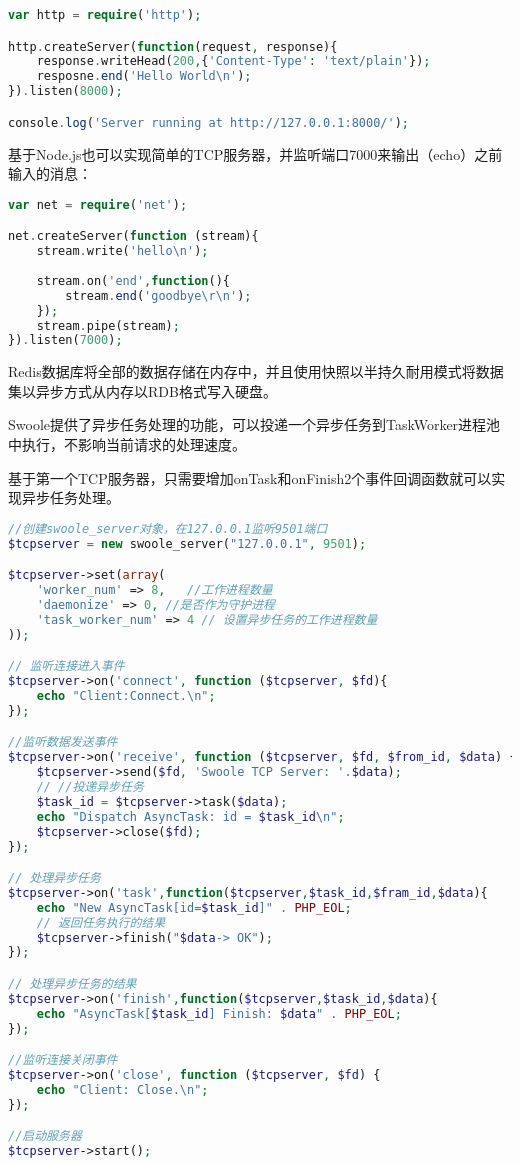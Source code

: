 \begin{lstlisting}[language=PHP]
var http = require('http');

http.createServer(function(request, response){
	response.writeHead(200,{'Content-Type': 'text/plain'});
	resposne.end('Hello World\n');
}).listen(8000);

console.log('Server running at http://127.0.0.1:8000/');
\end{lstlisting}

基于Node.js也可以实现简单的TCP服务器，并监听端口7000来输出（echo）之前输入的消息：

\begin{lstlisting}[language=PHP]
var net = require('net');

net.createServer(function (stream){
	stream.write('hello\n');
	
	stream.on('end',function(){
		stream.end('goodbye\r\n');
	});
	stream.pipe(stream);
}).listen(7000);
\end{lstlisting}

Redis数据库将全部的数据存储在内存中，并且使用快照以半持久耐用模式将数据集以异步方式从内存以RDB格式写入硬盘。

Swoole提供了异步任务处理的功能，可以投递一个异步任务到TaskWorker进程池中执行，不影响当前请求的处理速度。

基于第一个TCP服务器，只需要增加onTask和onFinish2个事件回调函数就可以实现异步任务处理。



\begin{lstlisting}[language=PHP]
//创建swoole_server对象，在127.0.0.1监听9501端口
$tcpserver = new swoole_server("127.0.0.1", 9501);

$tcpserver->set(array(
    'worker_num' => 8,   //工作进程数量
    'daemonize' => 0, //是否作为守护进程
    'task_worker_num' => 4 // 设置异步任务的工作进程数量
));

// 监听连接进入事件
$tcpserver->on('connect', function ($tcpserver, $fd){
    echo "Client:Connect.\n";
});

//监听数据发送事件
$tcpserver->on('receive', function ($tcpserver, $fd, $from_id, $data) {
    $tcpserver->send($fd, 'Swoole TCP Server: '.$data);
    // //投递异步任务
    $task_id = $tcpserver->task($data);
    echo "Dispatch AsyncTask: id = $task_id\n";
    $tcpserver->close($fd);
});

// 处理异步任务
$tcpserver->on('task',function($tcpserver,$task_id,$fram_id,$data){
	echo "New AsyncTask[id=$task_id]" . PHP_EOL;
	// 返回任务执行的结果
	$tcpserver->finish("$data-> OK");
});

// 处理异步任务的结果
$tcpserver->on('finish',function($tcpserver,$task_id,$data){
	echo "AsyncTask[$task_id] Finish: $data" . PHP_EOL;
});

//监听连接关闭事件
$tcpserver->on('close', function ($tcpserver, $fd) {
    echo "Client: Close.\n";
});

//启动服务器
$tcpserver->start();
\end{lstlisting}


